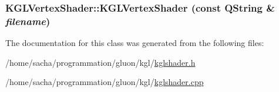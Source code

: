 \hypertarget{class_k_g_l_vertex_shader_b344fad22cc637f30d0380372fd4a5ec}{
\subsubsection[{KGLVertexShader}]{\setlength{\rightskip}{0pt plus 5cm}KGLVertexShader::KGLVertexShader (const QString \& {\em filename})}}
\label{class_k_g_l_vertex_shader_b344fad22cc637f30d0380372fd4a5ec}




The documentation for this class was generated from the following files:\begin{CompactItemize}
\item 
/home/sacha/programmation/gluon/kgl/\hyperlink{kglshader_8h}{kglshader.h}\item 
/home/sacha/programmation/gluon/kgl/\hyperlink{kglshader_8cpp}{kglshader.cpp}\end{CompactItemize}
